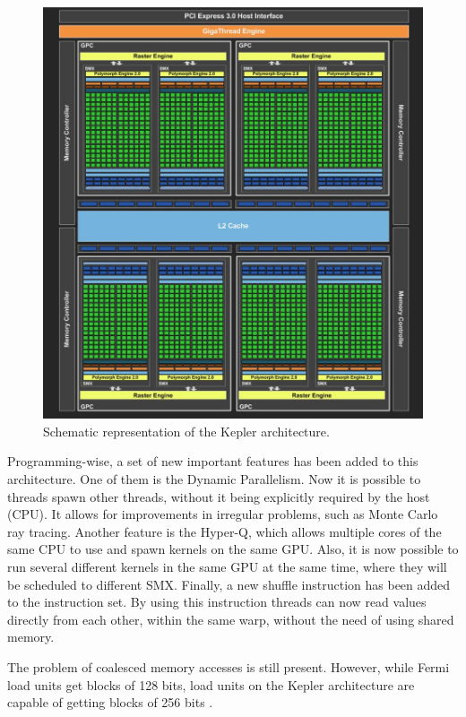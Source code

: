 \begin{figure}[!htp]
	\begin{center}
		\includegraphics[scale=0.4]{../../common/img/kepler_arch.jpg}
		\caption{Schematic representation of the \nvidia Kepler architecture.}
		\label{fig:kepler}
	\end{center}
\end{figure}

Programming-wise, a set of new important features has been added to this architecture. One of them is the Dynamic Parallelism. Now it is possible to \cuda threads spawn other threads, without it being explicitly required by the host (CPU). It allows for improvements in irregular problems, such as Monte Carlo ray tracing. Another feature is the Hyper-Q, which allows multiple cores of the same CPU to use and spawn kernels on the same GPU. Also, it is now possible to run several different kernels in the same GPU at the same time, where they will be scheduled to different SMX. Finally, a new shuffle instruction has been added to the instruction set. By using this instruction \cuda threads can now read values directly from each other, within the same warp, without the need of using shared memory.

The problem of coalesced memory accesses is still present. However, while Fermi load units get blocks of 128 bits, load units on the Kepler architecture are capable of getting blocks of 256 bits \cite{NVIDIA:Kepler}.

